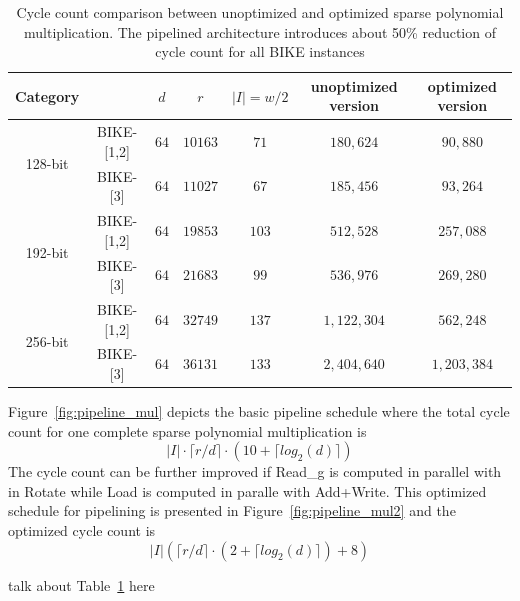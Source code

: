 \documentclass[runningheads]{llncs}
\begin{document}
\begin{table}[!tb]\centering
\caption{Cycle count comparison between unoptimized and optimized sparse polynomial multiplication. The pipelined architecture introduces about 50\% reduction of cycle count for all BIKE instances}
\begin{tabular}{cc|ccccc}
  \hline
 \textbf{Category}        &             & $d$ & $r$  & $|I|=w/2$  & unoptimized version& optimized version\\\hline
\multirow{ 2}{*}{128-bit} &  BIKE-[1,2] & $64$ & $10163$  & $71$  & $180,624$ & $90,880$\\
                          &  BIKE-[3] & $64$ & $11027$  & $67$  & $185,456$& $93,264$\\
  \hline
\multirow{ 2}{*}{192-bit} &  BIKE-[1,2] & $64$ & $19853$  & $103$  &$512,528$& $257,088$\\
                          &  BIKE-[3] & $64$ & $21683$  & $99$  &$536,976$& $269,280$\\
  \hline
\multirow{ 2}{*}{256-bit} &  BIKE-[1,2] & $64$ & $32749$  & $137$  &$1,122,304$& $562,248$\\
                          &  BIKE-[3] & $64$ & $36131$  & $133$  &$2,404,640$& $1,203,384$\\
  \hline
\end{tabular}
\label{tab::sparse}
\end{table}

Figure~\ref{fig:pipeline_mul} depicts the basic pipeline schedule where the total cycle count for one complete sparse polynomial multiplication is
\[
    |I|\cdot\lceil r/d\rceil\cdot (10+\lceil log_2(d)\rceil)
\]
The cycle count can be further improved if Read\_g is computed in parallel
with in Rotate while Load is computed in paralle with Add+Write. 
This optimized schedule for pipelining is presented in Figure~\ref{fig:pipeline_mul2} 
and the optimized cycle count is
\[
    |I|(\lceil r/d\rceil\cdot (2+\lceil log_2(d)\rceil) + 8)
\]

{\color{red} talk about Table~\ref{tab::sparse} here}
\end{document}
